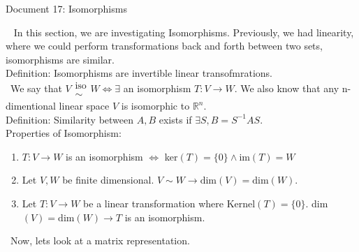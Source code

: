 \documentclass[11 pt]{article}
\begin{document}
\begin{center}
Document 17: Isomorphisms\\
\end{center}

\setlength{\leftskip}{0 in}
$\,\,\,$ In this section, we are investigating Isomorphisms. Previously, we had linearity, where we could perform transformations back and forth between two sets, isomorphisms are similar.\\

Definition: Isomorphisms are invertible linear transofmrations.\\

$\,\,\,$We say that $V\begin{matrix}\text{iso}\\\sim\end{matrix}W\Leftrightarrow \exists$ an isomorphism $T:V\rightarrow W$. We also know that any n-dimentional linear space $V$ is isomorphic to $\mathbb{R}^n$.\\

Definition: Similarity between $A,B$ exists if $\exists S,B=S^{-1}AS$.\\

Properties of Isomorphism:
\begin{enumerate}
\item $T:V\rightarrow W$ is an isomorphism $\Leftrightarrow$ ker$(T)=\lbrace 0\rbrace \land \text{im}(T)=W$
\item Let $V,W$ be finite dimensional. $V\sim W\rightarrow \text{dim}(V)=\text{dim}(W)$.
\item Let $T:V\rightarrow W$ be a linear transformation where Kernel$(T)=\lbrace 0 \rbrace$. dim$(V)=\text{dim}(W)\rightarrow T$ is an isomorphism.\\
\end{enumerate}

$\,\,\,$Now, lets look at a matrix representation.
\end{document}
